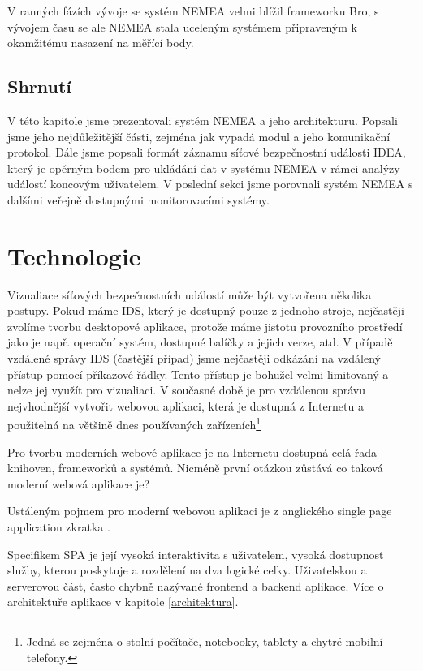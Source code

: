 V ranných fázích vývoje se systém NEMEA velmi blížil frameworku Bro, s vývojem času se ale NEMEA stala uceleným systémem připraveným k okamžitému nasazení na měřící body.

\section{Shrnutí}

V této kapitole jsme prezentovali systém NEMEA a jeho architekturu. Popsali jsme jeho nejdůležitější části, zejména jak vypadá modul a jeho komunikační protokol. Dále jsme popsali formát záznamu síťové bezpečnostní události IDEA, který je opěrným bodem pro ukládání dat v systému NEMEA v rámci analýzy událostí koncovým uživatelem. V poslední sekci jsme porovnali systém NEMEA s dalšími veřejně dostupnými monitorovacími systémy.


\chapter{Technologie}

Vizualiace síťových bezpečnostních událostí může být vytvořena několika postupy. Pokud máme IDS, který je dostupný pouze z jednoho stroje, nejčastěji zvolíme tvorbu desktopové aplikace, protože máme jistotu provozního prostředí jako je např. operační systém, dostupné balíčky a jejich verze, atd. V případě vzdálené správy IDS (častější případ) jsme nejčastěji odkázání na vzdálený přístup pomocí příkazové řádky. Tento přístup je bohužel velmi limitovaný a nelze jej využít pro vizualiaci. V současné době je pro vzdálenou správu nejvhodnější vytvořit webovou aplikaci, která je dostupná z Internetu a použitelná na většině dnes používaných zařízeních\footnote{Jedná se zejména o stolní počítače, notebooky, tablety a chytré mobilní telefony.}

Pro tvorbu moderních webové aplikace je na Internetu dostupná celá řada knihoven, frameworků a systémů. Nicméně první otázkou zůstává co taková moderní webová aplikace je?

Ustáleným pojmem pro moderní webovou aplikaci je z anglického single page application\cite{spa} zkratka .

Specifikem SPA je její vysoká interaktivita s uživatelem, vysoká dostupnost služby, kterou poskytuje a rozdělení na dva logické celky. Uživatelskou a serverovou část, často chybně nazývané frontend a backend aplikace. Více o architektuře aplikace v kapitole \ref{architektura}.

